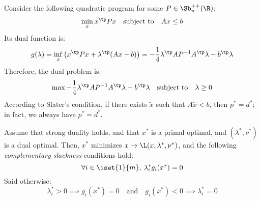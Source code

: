 \begin{example}
    Consider the following quadratic program for some $P\in\Sb_n^{++}(\R)$:
    \begin{equation*}
        \min_x x^\tp Px \quad\text{subject to}\quad Ax\leq b
    \end{equation*}
    Its dual function is:
    \begin{equation*}
        g(\lambda) = \inf_x \left(x^\tp Px + \lambda^\tp(Ax-b)\right) = - \frac{1}{4}\lambda^\tp AP^{-1}A^\tp\lambda - b^\tp\lambda
    \end{equation*}
    Therefore, the dual problem is:
    \begin{equation*}
        \max -\frac{1}{4}\lambda^\tp AP^{-1}A^\tp\lambda - b^\tp\lambda \quad\text{subject to}\quad \lambda\geq0
    \end{equation*}
    According to Slater's condition, if there exists $\tilde{x}$ such that $A\tilde{x}<b$, then $p^*=d^*$; in fact, we always have $p^*=d^*$.
\end{example}

\begin{property}
    Assume that strong duality holds, and that $x^*$ is a primal optimal, and $(\lambda^*, \nu^*)$ is a dual optimal. Then, $x^*$ minimizes $x\to\L(x, \lambda^*, \nu^*)$, and the following \emph{complementary slackness} conditions hold:
    \begin{equation}
        \forall i\in\iset{1}{m}, \: \lambda_i^*g_i(x^*) = 0
    \end{equation}
    Said otherwise:
    \begin{equation*}
        \lambda_i^* > 0 \implies g_i(x^*) = 0 \quad\text{and}\quad g_i(x^*) < 0 \implies \lambda_i^* = 0
    \end{equation*}
\end{property}

